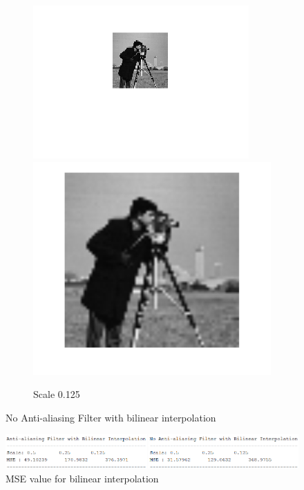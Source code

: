\documentclass{article}
\begin{document}
\begin{figure}[h!]
\begin{subfigure}[t]{0.3\textwidth}
		\includegraphics[width=\linewidth]{./output_images/DOWN_no_anti-alias_bilinear_scale_0_125000.png}
		\includegraphics[width=\linewidth]{./output_images/UP_no_anti-alias_bilinear_scale_0_125000.png}
		\caption{Scale 0.125}
	\end{subfigure}
	\caption{No Anti-aliasing Filter with bilinear interpolation}
\end{figure}

\pagebreak

\begin{figure}[h!]
	\centering
	\includegraphics[width=\linewidth]{./output_images/MSE_bilinear.png}
	\caption{MSE value for bilinear interpolation}
\end{figure}
\end{document}
